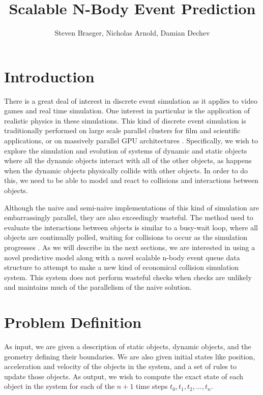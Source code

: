 \documentclass[CEJCS,PDF]{cej} %
\title{Scalable N-Body Event Prediction}
\author{Steven Braeger\inst{1}\email{steve@soapforge.com},
        Nicholas Arnold\inst{1}\email{narnold@knights.ucf.edu},
        Damian Dechev\inst{1}\email{dechev@eecs.ucf.edu}}
\institute{
     \inst{1} University of Central Florida,\\
     4000 Central Florida Blvd., 32816 Orlando, Florida, USA
          }
\begin{document}
\maketitle



\section{Introduction}

There is a great deal of interest in discrete event simulation as it applies to video games and real time simulation. One interest in particular is the application of realistic physics in these simulations.  This kind of discrete event simulation is traditionally performed on large scale parallel clusters for film and scientific applications, or on massively parallel GPU architectures \cite{grape,uberflow}.  Specifically, we wish to explore the simulation and evolution of systems of dynamic and static objects where all the dynamic objects interact with all of the other objects, as happens when the dynamic objects physically collide with other objects.  In order to do this, we need to be able to model and react to collisions and interactions between objects. 

Although the naive and semi-naive implementations of this kind of simulation are embarrassingly parallel, they are also exceedingly wasteful.  The method used to evaluate the interactions between objects is similar to a busy-wait loop, where all objects are continually polled, waiting for collisions to occur as the simulation progresses \cite{nbodycollisions,Moore88collisiondetection}.   As we will describe in the next sections, we are interested in using a novel predictive model along with a novel scalable n-body event queue data structure to attempt to make a new kind of economical collision simulation system.  This system does not perform wasteful checks when checks are unlikely and maintains much of the parallelism of the naive solution.

\section{Problem Definition}

As input, we are given a description of static objects, dynamic objects, and the geometry defining their boundaries.  We are also given initial states like position, acceleration and velocity of the objects in the system, and a set of rules to update those objects.  As output, we wish to compute the exact state of each object in the system for each of the $n+1$ time steps $t_0, t_1, t_2, \ldots, t_n$.
\end{document}
